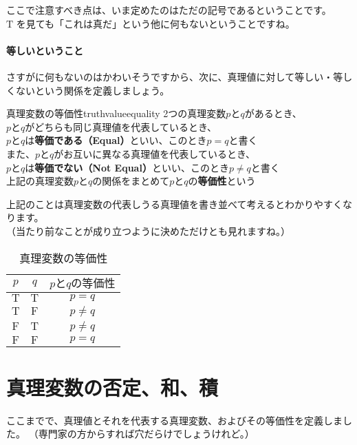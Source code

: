 \documentclass[report]{jlreq}%
\newcounter{myso}
\begin{document}
ここで注意すべき点は、いま定めたのはただの記号であるということです。\\
$\mathrm{T}$ を見ても「これは真だ」という他に何もないということですね。
\pagebreak

\paragraph*{等しいということ} 
さすがに何もないのはかわいそうですから、次に、真理値に対して等しい・等しくないという関係を定義しましょう。

\begin{mysodef}{真理変数の等価性}{truthvalueequality}
	2つの真理変数$p$と$q$があるとき、\\
	$p$と$q$がどちらも同じ真理値を代表しているとき、\\
	$p$と$q$は\textbf{等価である（Equal）}といい、このとき$p=q$と書く\\
	また、$p$と$q$がお互いに異なる真理値を代表しているとき、\\
	$p$と$q$は\textbf{等価でない（Not Equal）}といい、このとき$p\ne{}q$と書く\\
	上記の真理変数$p$と$q$の関係をまとめて$p$と$q$の\textbf{等価性}という
\end{mysodef}
上記のことは真理変数の代表しうる真理値を書き並べて考えるとわかりやすくなります。\\
（当たり前なことが成り立つように決めただけとも見れますね。）
\begin{table}[htbp]
	\caption{真理変数の等価性}
	\label{tb:truthvalueequality}
	\centering
	\begin{tabular}{|c|c|c|}
		\hline
		$p$ & $q$ & $pとqの等価性$ \\
		\hline\hline
		$\mathrm{T}$ & $\mathrm{T}$ & $p=q$ \\
		\hline
		$\mathrm{T}$ & $\mathrm{F}$ & $p\ne{}q$ \\
		\hline
		$\mathrm{F}$ & $\mathrm{T}$ & $p\ne{}q$ \\
		\hline
		$\mathrm{F}$ & $\mathrm{F}$ & $p=q$ \\
		\hline
	\end{tabular}
\end{table}

\section{真理変数の否定、和、積}
ここまでで、真理値とそれを代表する真理変数、およびその等価性を定義しました。
（専門家の方からすれば穴だらけでしょうけれど。）\\
\end{document}
